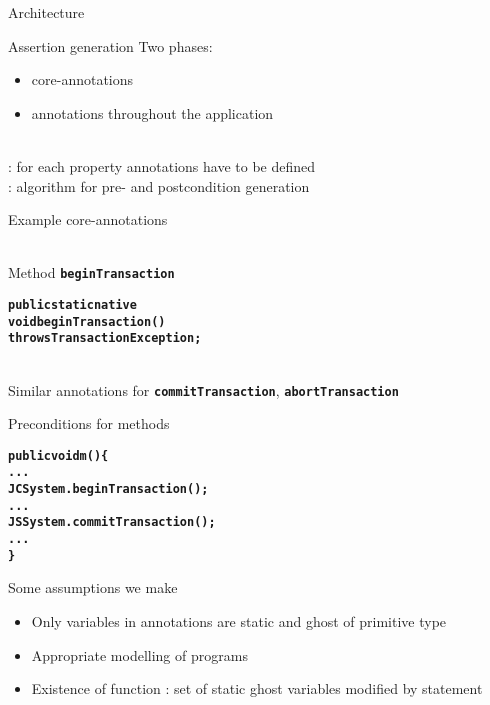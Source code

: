 \documentclass[final,nocolorBG,a4,marieke,nototal,pdf, accumulate,slideColor]{prosper}
\newcommand{\textttbf}[1]{\texttt{\textbf{#1}}}
\begin{document}
\begin{slide}{Architecture}
\end{slide}

\begin{slide}{Assertion generation}
Two phases:
\begin{itemize}
\item {} core-annotations
\item {} annotations throughout the application
\end{itemize}
\ \smallskip\\
: for each property annotations have to be defined
\bigskip\\
: algorithm for pre- and postcondition generation
\end{slide}

\begin{slide}{Example core-annotations}
\begin{alltt}
\end{alltt}
\ \smallskip\\
Method \textttbf{beginTransaction}
\begin{alltt}
\textbf{public static native 
   void beginTransaction() 
        throws TransactionException;}
\end{alltt}
\ \smallskip\\
Similar annotations for \textttbf{commitTransaction},
\textttbf{abortTransaction} 
\end{slide}


\begin{slide}{Preconditions for methods}
\begin{alltt}
\textbf{public void m() \{
   ...
   JCSystem.beginTransaction();
   ...
   JSSystem.commitTransaction();
   ...
   \}}
\end{alltt}
\end{slide}

\begin{slide}{Some assumptions we make}
\begin{itemize}
  \item Only variables in annotations are static and ghost of primitive type
  \item Appropriate modelling of programs
  \item Existence of function {\large\textsf{}}: set of static ghost
variables modified by statement 
\end{itemize}
\end{slide}
\end{document}
